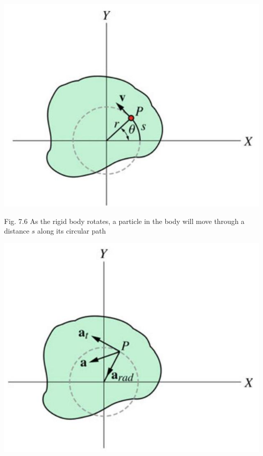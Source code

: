 \documentclass[10pt]{article}
\begin{document}
\begin{center}
\includegraphics[max width=\textwidth]{2024_09_13_db1f357d2aad0a03eb2eg-115(2)}
\end{center}

Fig. 7.6 As the rigid body rotates, a particle in the body will move through a distance $s$ along its circular path

\begin{center}
\includegraphics[max width=\textwidth]{2024_09_13_db1f357d2aad0a03eb2eg-115(1)}
\end{center}
\end{document}
